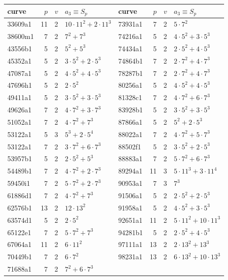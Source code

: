 \begin{tabular}{lrrl@{\qquad}lrrl}
\hline
curve & $p$ & $v$ & $a_3\equiv S_p$ & curve & $p$ & $v$ & $a_3\equiv S_p$\\
\hline
33609a1 & 11 & 2 & $10\cdot11^{2}+2\cdot11^{3}$ & 73931a1 & 7 & 2 & $5\cdot7^{2}$\\
38600m1 & 7 & 2 & $7^{2}+7^{3}$ & 74216a1 & 5 & 2 & $4\cdot5^{2}+3\cdot5^{3}$\\
43556b1 & 5 & 2 & $5^{2}+5^{3}$ & 74434a1 & 5 & 2 & $2\cdot5^{2}+4\cdot5^{3}$\\
45352a1 & 5 & 2 & $3\cdot5^{2}+2\cdot5^{3}$ & 74864b1 & 7 & 2 & $2\cdot7^{2}+4\cdot7^{3}$\\
47087a1 & 5 & 2 & $4\cdot5^{2}+4\cdot5^{3}$ & 78287b1 & 7 & 2 & $2\cdot7^{2}+4\cdot7^{3}$\\
47696h1 & 5 & 2 & $2\cdot5^{2}$ & 80256a1 & 5 & 2 & $4\cdot5^{2}+4\cdot5^{3}$\\
49411a1 & 5 & 2 & $3\cdot5^{2}+3\cdot5^{3}$ & 81328c1 & 7 & 2 & $4\cdot7^{2}+6\cdot7^{3}$\\
49626a1 & 7 & 2 & $4\cdot7^{2}+3\cdot7^{3}$ & 83928b1 & 5 & 2 & $3\cdot5^{2}+3\cdot5^{3}$\\
51052a1 & 7 & 2 & $4\cdot7^{2}+7^{3}$ & 87866a1 & 5 & 2 & $5^{2}+2\cdot5^{3}$\\
53122a1 & 5 & 3 & $5^{3}+2\cdot5^{4}$ & 88022a1 & 7 & 2 & $4\cdot7^{2}+5\cdot7^{3}$\\
53122a1 & 7 & 2 & $3\cdot7^{2}+6\cdot7^{3}$ & 88502f1 & 5 & 2 & $3\cdot5^{2}+2\cdot5^{3}$\\
53957b1 & 5 & 2 & $2\cdot5^{2}+5^{3}$ & 88883a1 & 7 & 2 & $5\cdot7^{2}+6\cdot7^{3}$\\
54489b1 & 7 & 2 & $4\cdot7^{2}+2\cdot7^{3}$ & 89294a1 & 11 & 3 & $5\cdot11^{3}+3\cdot11^{4}$\\
59450i1 & 7 & 2 & $5\cdot7^{2}+2\cdot7^{3}$ & 90953a1 & 7 & 3 & $7^{3}$\\
61886d1 & 7 & 2 & $4\cdot7^{2}+7^{3}$ & 91506a1 & 5 & 2 & $2\cdot5^{2}+2\cdot5^{3}$\\
62576b1 & 13 & 2 & $12\cdot13^{2}$ & 91958a1 & 5 & 2 & $4\cdot5^{2}+3\cdot5^{3}$\\
63574d1 & 5 & 2 & $2\cdot5^{2}$ & 92651a1 & 11 & 2 & $5\cdot11^{2}+10\cdot11^{3}$\\
65122e1 & 7 & 2 & $5\cdot7^{2}+7^{3}$ & 94281b1 & 5 & 2 & $2\cdot5^{2}+4\cdot5^{3}$\\
67064a1 & 11 & 2 & $6\cdot11^{2}$ & 97111a1 & 13 & 2 & $2\cdot13^{2}+13^{3}$\\
70449b1 & 7 & 2 & $6\cdot7^{2}$ & 98231a1 & 13 & 2 & $6\cdot13^{2}+10\cdot13^{3}$\\
71688a1 & 7 & 2 & $7^{2}+6\cdot7^{3}$ &  &  &  & \\
\hline
\end{tabular}

